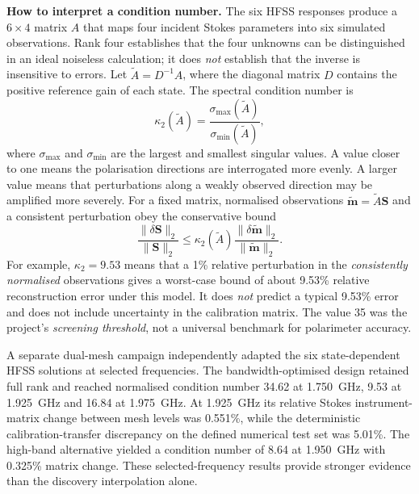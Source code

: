 \documentclass{ieeeaccess}
\begin{document}
\noindent\textbf{How to interpret a condition number.} The six HFSS responses produce a $6\times4$ matrix $A$ that maps four incident Stokes parameters into six simulated observations. Rank four establishes that the four unknowns can be distinguished in an ideal noiseless calculation; it does \emph{not} establish that the inverse is insensitive to errors. Let $\widetilde A=D^{-1}A$, where the diagonal matrix $D$ contains the positive reference gain of each state. The spectral condition number is
\begin{equation}
\kappa_2(\widetilde A)=\frac{\sigma_{\max}(\widetilde A)}{\sigma_{\min}(\widetilde A)},
\label{eq:condition_interpretation}
\end{equation}
where $\sigma_{\max}$ and $\sigma_{\min}$ are the largest and smallest singular values. A value closer to one means the polarisation directions are interrogated more evenly. A larger value means that perturbations along a weakly observed direction may be amplified more severely. For a fixed matrix, normalised observations $\widetilde{\boldsymbol m}=\widetilde A\boldsymbol S$ and a consistent perturbation obey the conservative bound
\begin{equation}
\frac{\|\delta\boldsymbol S\|_2}{\|\boldsymbol S\|_2}
\le \kappa_2(\widetilde A)
\frac{\|\delta\widetilde{\boldsymbol m}\|_2}
{\|\widetilde{\boldsymbol m}\|_2}.
\label{eq:condition_error_bound}
\end{equation}
For example, $\kappa_2=9.53$ means that a 1\% relative perturbation in the \emph{consistently normalised} observations gives a worst-case bound of about 9.53\% relative reconstruction error under this model. It does \emph{not} predict a typical 9.53\% error and does not include uncertainty in the calibration matrix. The value 35 was the project's \emph{screening threshold}, not a universal benchmark for polarimeter accuracy.

A separate dual-mesh campaign independently adapted the six state-dependent HFSS solutions at selected frequencies. The bandwidth-optimised design retained full rank and reached normalised condition number 34.62 at 1.750~GHz, 9.53 at 1.925~GHz and 16.84 at 1.975~GHz. At 1.925~GHz its relative Stokes instrument-matrix change between mesh levels was 0.551\%, while the deterministic calibration-transfer discrepancy on the defined numerical test set was 5.01\%. The high-band alternative yielded a condition number of 8.64 at 1.950~GHz with 0.325\% matrix change. These selected-frequency results provide stronger evidence than the discovery interpolation alone.
\end{document}
